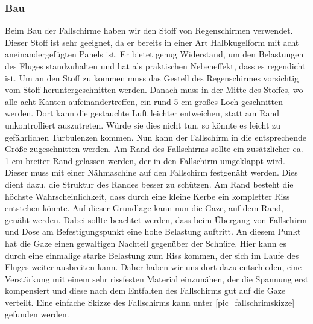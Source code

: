 \subsubsection{Bau}
Beim Bau der Fallschirme haben wir den Stoff von Regenschirmen verwendet. Dieser Stoff ist sehr geeignet, da er bereits in einer Art Halbkugelform mit acht aneinandergefügten Panels ist. Er bietet genug Widerstand, um den Belastungen des Fluges standzuhalten und hat als praktischen Nebeneffekt, dass es regendicht ist. Um an den Stoff zu kommen muss das Gestell des Regenschirmes vorsichtig vom Stoff heruntergeschnitten werden. Danach muss in der Mitte des Stoffes, wo alle acht Kanten aufeinandertreffen, ein rund 5 cm großes Loch geschnitten werden. Dort kann die gestauchte Luft leichter entweichen, statt am Rand unkontrolliert auszutreten. Würde sie dies nicht tun, so könnte es leicht zu gefährlichen Turbulenzen kommen. Nun kann der Fallschirm in die entsprechende Größe zugeschnitten werden. Am Rand des Fallschirms sollte ein zusätzlicher ca. 1 cm breiter Rand gelassen werden, der in den Fallschirm umgeklappt wird. Dieser muss mit einer Nähmaschine auf den Fallschirm festgenäht werden. Dies dient dazu, die Struktur des Randes besser zu schützen. Am Rand besteht die höchste Wahrscheinlichkeit, dass durch eine kleine Kerbe ein kompletter Riss entstehen könnte. Auf dieser Grundlage kann nun die Gaze, auf dem Rand, genäht werden. Dabei sollte beachtet werden, dass beim Übergang von Fallschirm und Dose am Befestigungspunkt eine hohe Belastung auftritt. An diesem Punkt hat die Gaze einen gewaltigen Nachteil gegenüber der Schnüre. Hier kann es durch eine einmalige starke Belastung zum Riss kommen, der sich im Laufe des Fluges weiter ausbreiten kann. Daher haben wir uns dort dazu entschieden, eine Verstärkung mit einem sehr rissfesten Material einzunähen, der die Spannung erst kompensiert und diese nach dem Entfalten des Fallschirms gut auf die Gaze verteilt. Eine einfache Skizze des Fallschirms kann unter \ref{pic_fallschrimskizze} gefunden werden.